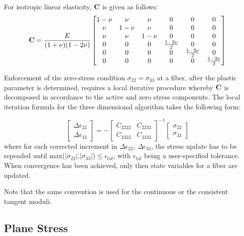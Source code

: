 \begin{appendices}
For isotropic linear elasticity, $\mathbf{C}$ is given as follows:
\begin{equation*}
	\mathbf{C} = \frac{E}{(1+\nu)(1-2\nu)}\begin{bmatrix}
		1-\nu & \nu & \nu & 0 & 0 & 0\\
		\nu & 1-\nu & \nu & 0 & 0 & 0\\
		\nu & \nu & 1-\nu & 0 & 0 & 0\\
		0 & 0 & 0 & \frac{1-2\nu}{2} & 0 & 0\\
		0 & 0 & 0 & 0 & \frac{1-2\nu}{2}  & 0\\
		0 & 0 & 0 & 0 & 0 & \frac{1-2\nu}{2} \\
	\end{bmatrix}
\end{equation*}

Enforcement of the zero-stress condition $\sigma_{22}=\sigma_{33}$ at a fiber, 
after the plastic parameter is determined, requires a local iterative procedure 
whereby $\mathbf{C}$ is decomposed in accordance to the active and zero stress 
components. The local iteration formula for the three dimensional algorithm 
takes the following form:

\begin{equation*}
	\begin{bmatrix}
		\Delta \epsilon_{22}\\
		\Delta \epsilon_{33}
	\end{bmatrix} = -\begin{bmatrix}
	C_{2222} & C_{2233}\\
	C_{3322} & C_{3333}
\end{bmatrix}^{-1}\begin{bmatrix}
\sigma_{22}\\
\sigma_{33}
\end{bmatrix}
\end{equation*}
\noindent where for each corrected increment in $\Delta\epsilon_{22}$, 
$\Delta\epsilon_{33}$, the stress update has to be repeaded until 
max($\vert\sigma_{22}\vert$,$\vert\sigma_{33}\vert$)$\leq \epsilon_{tol}$, with 
$\epsilon_{tol}$ being a user-specified tolerance. When convergence has been 
achieved, only then state variables for a fiber are updated.

Note that the same convention is used for the continuous or the consistent 
tangent moduli.

\subsection*{Plane Stress}


\end{appendices}
